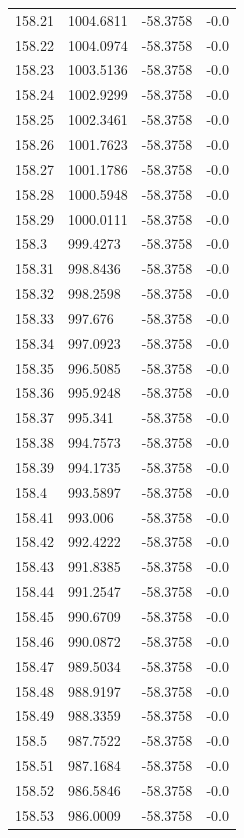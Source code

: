 \begin{table}[H]
\begin{tabular}{llll}
158.21 & 1004.6811 & -58.3758 & -0.0 \\
158.22 & 1004.0974 & -58.3758 & -0.0 \\
158.23 & 1003.5136 & -58.3758 & -0.0 \\
158.24 & 1002.9299 & -58.3758 & -0.0 \\
158.25 & 1002.3461 & -58.3758 & -0.0 \\
158.26 & 1001.7623 & -58.3758 & -0.0 \\
158.27 & 1001.1786 & -58.3758 & -0.0 \\
158.28 & 1000.5948 & -58.3758 & -0.0 \\
158.29 & 1000.0111 & -58.3758 & -0.0 \\
158.3 & 999.4273 & -58.3758 & -0.0 \\
158.31 & 998.8436 & -58.3758 & -0.0 \\
158.32 & 998.2598 & -58.3758 & -0.0 \\
158.33 & 997.676 & -58.3758 & -0.0 \\
158.34 & 997.0923 & -58.3758 & -0.0 \\
158.35 & 996.5085 & -58.3758 & -0.0 \\
158.36 & 995.9248 & -58.3758 & -0.0 \\
158.37 & 995.341 & -58.3758 & -0.0 \\
158.38 & 994.7573 & -58.3758 & -0.0 \\
158.39 & 994.1735 & -58.3758 & -0.0 \\
158.4 & 993.5897 & -58.3758 & -0.0 \\
158.41 & 993.006 & -58.3758 & -0.0 \\
158.42 & 992.4222 & -58.3758 & -0.0 \\
158.43 & 991.8385 & -58.3758 & -0.0 \\
158.44 & 991.2547 & -58.3758 & -0.0 \\
158.45 & 990.6709 & -58.3758 & -0.0 \\
158.46 & 990.0872 & -58.3758 & -0.0 \\
158.47 & 989.5034 & -58.3758 & -0.0 \\
158.48 & 988.9197 & -58.3758 & -0.0 \\
158.49 & 988.3359 & -58.3758 & -0.0 \\
158.5 & 987.7522 & -58.3758 & -0.0 \\
158.51 & 987.1684 & -58.3758 & -0.0 \\
158.52 & 986.5846 & -58.3758 & -0.0 \\
158.53 & 986.0009 & -58.3758 & -0.0 \\

\end{tabular}
\end{table}
